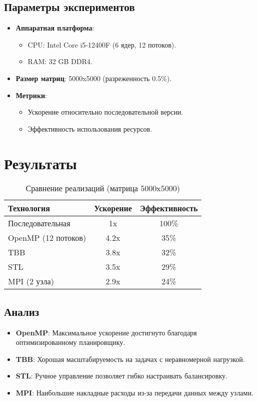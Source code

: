 \documentclass[a4paper,12pt]{article}
\begin{document}
\subsection{Параметры экспериментов}
\begin{itemize}
\item \textbf{Аппаратная платформа}: 
  \begin{itemize}
  \item CPU: Intel Core i5-12400F (6 ядер, 12 потоков).
  \item RAM: 32 GB DDR4.
  \end{itemize}
\item \textbf{Размер матриц}: 5000x5000 (разреженность 0.5\%).
\item \textbf{Метрики}: 
  \begin{itemize}
  \item Ускорение относительно последовательной версии.
  \item Эффективность использования ресурсов.
  \end{itemize}
\end{itemize}

\section{Результаты}
\begin{table}[H]
\centering
\caption{Сравнение реализаций (матрица 5000x5000)}
\begin{tabular}{|l|c|c|}
\hline
\textbf{Технология} & \textbf{Ускорение} & \textbf{Эффективность} \\ \hline
Последовательная & 1x & 100\% \\ \hline
OpenMP (12 потоков) & 4.2x & 35\% \\ \hline
TBB & 3.8x & 32\% \\ \hline
STL & 3.5x & 29\% \\ \hline
MPI (2 узла) & 2.9x & 24\% \\ \hline
\end{tabular}
\end{table}

\subsection{Анализ}
\begin{itemize}
\item \textbf{OpenMP}: Максимальное ускорение достигнуто благодаря оптимизированному планировщику.
\item \textbf{TBB}: Хорошая масштабируемость на задачах с неравномерной нагрузкой.
\item \textbf{STL}: Ручное управление позволяет гибко настраивать балансировку.
\item \textbf{MPI}: Наибольшие накладные расходы из-за передачи данных между узлами.
\end{itemize}
\end{document}
